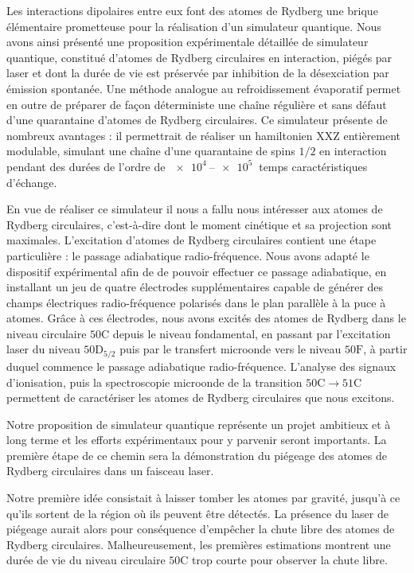 Les interactions dipolaires entre eux font des atomes de Rydberg une \og brique élémentaire \fg{} prometteuse pour la réalisation d'un simulateur quantique.
Nous avons ainsi présenté une proposition expérimentale détaillée de simulateur quantique, constitué d'atomes de Rydberg circulaires en interaction, piégés par laser et dont la durée de vie est préservée par inhibition de la désexciation par émission spontanée.
Une méthode analogue au refroidissement évaporatif permet en outre de préparer de façon déterministe une chaîne régulière et sans défaut d'une quarantaine d'atomes de Rydberg circulaires.
Ce simulateur présente de nombreux avantages : il permettrait de réaliser un hamiltonien $\mathrm{XXZ}$ entièrement modulable, simulant une chaîne d'une quarantaine de spins $1/2$ en interaction pendant des durées de l'ordre de $\SIrange{e4}{e5}{}$ temps caractéristiques d'échange.

En vue de réaliser ce simulateur il nous a fallu nous intéresser aux atomes de Rydberg circulaires, c'est-à-dire dont le moment cinétique et sa projection sont maximales.
L'excitation d'atomes de Rydberg circulaires contient une étape particulière : le passage adiabatique radio-fréquence.
Nous avons adapté le dispositif expérimental afin de de pouvoir effectuer ce passage adiabatique, en installant un jeu de quatre électrodes supplémentaires capable de générer des champs électriques radio-fréquence polarisés dans le plan parallèle à la puce à atomes.
Grâce à ces électrodes, nous avons excités des atomes de Rydberg dans le niveau circulaire $\mathrm{50C}$ depuis le niveau fondamental, en passant par l'excitation laser du niveau $\mathrm{50D_{5/2}}$ puis par le transfert microonde vers le niveau $\mathrm{50F}$, à partir duquel commence le passage adiabatique radio-fréquence.
L'analyse des signaux d'ionisation, puis la spectroscopie microonde de la transition $\mathrm{50C \rightarrow 51C}$ permettent de caractériser les atomes de Rydberg circulaires que nous excitons.

\bigskip
Notre proposition de simulateur quantique représente un projet ambitieux et à long terme et les efforts expérimentaux pour y parvenir seront importants.
La première étape de ce chemin sera la démonstration du piégeage des atomes de Rydberg circulaires dans un faisceau laser.

Notre première idée consistait à laisser tomber les atomes par gravité, jusqu'à ce qu'ils sortent de la région où ils peuvent être détectés.
La présence du laser de piégeage aurait alors pour conséquence d'empêcher la chute libre des atomes de Rydberg circulaires.
Malheureusement, les premières estimations montrent une durée de vie du niveau circulaire $\mathrm{50C}$ trop courte pour observer la chute libre.

